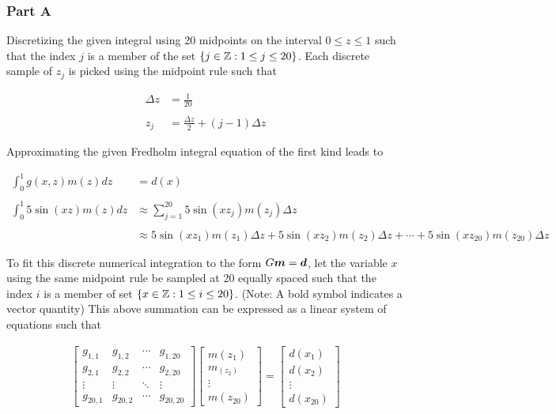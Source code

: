 \subsubsection{Part A}

 Discretizing the given integral using 20 midpoints on the interval $0 \leq z \leq 1$ such that the index $j$ is a member of the set $\{j \in \mathbb{Z} : 1 \leq j \leq 20\}$. Each discrete sample of $z_j$ is picked using the midpoint rule such that
 
 \begin{align*}
 	\Delta z &= \frac{1}{20} \\
 	\\
 	z_j &= \frac{\Delta z}{2} + \left(j - 1\right) \Delta z
 \end{align*}
 
 Approximating the given Fredholm integral equation of the first kind leads to

\begin{align*}
	\int_{0}^{1} g(x,z) m(z) dz &= d(x) \\
	\\
	\int_{0}^{1} 5 \sin(xz) m(z) dz &\approx \sum_{j = 1}^{20} 5 \sin(xz_{j}) m(z_{j}) \Delta z \\
	\\
	&\approx 5 \sin(xz_{1}) m(z_{1}) \Delta z + 5 \sin(xz_{2}) m(z_{2}) \Delta z + \cdots + 5 \sin(xz_{20}) m(z_{20}) \Delta z
\end{align*}

To fit this discrete numerical integration to the form $G\boldsymbol{m} = \boldsymbol{d}$, let the variable $x$ using the same midpoint rule be sampled at 20 equally spaced such that the index $i$ is a member of set $\{x \in \mathbb{Z} : 1 \leq i \leq 20\}$. (Note: A bold symbol indicates a vector quantity) This above summation can be expressed as a linear system of equations such that

\begin{align*}
	\begin{bmatrix}
		g_{1,1} & g_{1,2} & \cdots & g_{1,20} \\ 
		g_{2,1} & g_{2,2} & \cdots & g_{2,20} \\ 
		\vdots & \vdots & \ddots & \vdots \\
		g_{20,1} & g_{20,2} & \cdots & g_{20,20}
	\end{bmatrix}
	\begin{bmatrix}
		m(z_{1}) \\ m_(z_{2}) \\ \vdots \\ m(z_{20})
	\end{bmatrix}
	= \begin{bmatrix}
		d(x_{1}) \\ d(x_{2}) \\ \vdots \\ d(x_{20})
	\end{bmatrix}
\end{align*}

